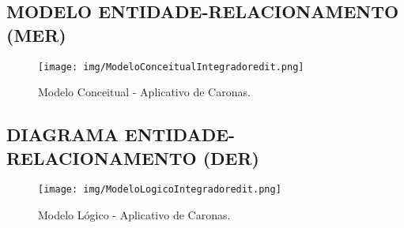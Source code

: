 \begin{anexosenv}


\begin{landscape}

	\chapter{MODELO ENTIDADE-RELACIONAMENTO (MER)}
	
	\begin{figure}[htb!]
		\centering
		\caption{Modelo Conceitual - Aplicativo de Caronas.}
		\texttt{[image: img/ModeloConceitualIntegradoredit.png]} 
		\label{fig:modelo_conceitual_banco}
	\end{figure}
	
\end{landscape}


\begin{landscape}
	
	\chapter{DIAGRAMA ENTIDADE-RELACIONAMENTO (DER)}
	
	\begin{figure}[htb!]
		\centering
		\caption{Modelo Lógico - Aplicativo de Caronas.}
		\texttt{[image: img/ModeloLogicoIntegradoredit.png]}
		\label{fig:modelo_logico_banco}
	\end{figure}
	
\end{landscape}


\end{anexosenv}
